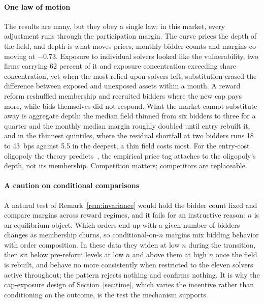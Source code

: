 \documentclass[11pt]{article}
\theoremstyle{plain}
\theoremstyle{definition}
\theoremstyle{remark}
\begin{document}
\paragraph{One law of motion} The results are many, but they obey a single law: in this market, every adjustment runs through the participation margin. The curve prices the depth of the field, and depth is what moves prices, monthly bidder counts and margins co-moving at $-0.73$. Exposure to individual solvers looked like the vulnerability, two firms carrying 62 percent of it and exposure concentration exceeding share concentration, yet when the most-relied-upon solvers left, substitution erased the difference between exposed and unexposed assets within a month. A reward reform reshuffled membership and recruited bidders where the new cap pays more, while bids themselves did not respond. What the market cannot substitute away is aggregate depth: the median field thinned from six bidders to three for a quarter and the monthly median margin roughly doubled until entry rebuilt it, and in the thinnest quintiles, where the residual shortfall at two bidders runs 18 to 43~bps against 5.5 in the deepest, a thin field costs most. For the entry-cost oligopoly the theory predicts~\citep{chitra2024intent}, the empirical price tag attaches to the oligopoly's depth, not its membership. Competition matters; competitors are replaceable.

\paragraph{A caution on conditional comparisons} A natural test of Remark~\ref{rem:invariance} would hold the bidder count fixed and compare margins across reward regimes, and it fails for an instructive reason: $n$ is an equilibrium object. Which orders end up with a given number of bidders changes as membership churns, so conditional-on-$n$ margins mix bidding behavior with order composition. In these data they widen at low $n$ during the transition, then sit below pre-reform levels at low $n$ and above them at high $n$ once the field is rebuilt, and behave no more consistently when restricted to the eleven solvers active throughout; the pattern rejects nothing and confirms nothing. It is why the cap-exposure design of Section~\ref{sec:time}, which varies the incentive rather than conditioning on the outcome, is the test the mechanism supports.
\end{document}
